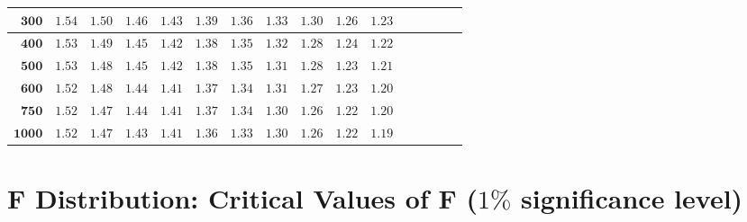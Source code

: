 \begin{longtable}{|r|r|r|r|r|r|r|r|r|r|r|r|r|r|r|r|}
    \(\mathbf{300}\)& \(1.54\) & \(1.50\) & \(1.46\) & \(1.43\) & \(1.39\) & \(1.36\) & \(1.33\) & \(1.30\) & \(1.26\) & \(1.23\) \\ \hline 
    \(\mathbf{400}\)& \(1.53\) & \(1.49\) & \(1.45\) & \(1.42\) & \(1.38\) & \(1.35\) & \(1.32\) & \(1.28\) & \(1.24\) & \(1.22\) \\ \hline 
    \(\mathbf{500}\)& \(1.53\) & \(1.48\) & \(1.45\) & \(1.42\) & \(1.38\) & \(1.35\) & \(1.31\) & \(1.28\) & \(1.23\) & \(1.21\) \\ \hline 
    \(\mathbf{600}\)& \(1.52\) & \(1.48\) & \(1.44\) & \(1.41\) & \(1.37\) & \(1.34\) & \(1.31\) & \(1.27\) & \(1.23\) & \(1.20\) \\ \hline 
    \(\mathbf{750}\)& \(1.52\) & \(1.47\) & \(1.44\) & \(1.41\) & \(1.37\) & \(1.34\) & \(1.30\) & \(1.26\) & \(1.22\) & \(1.20\) \\ \hline 
    \(\mathbf{1000}\)& \(1.52\) & \(1.47\) & \(1.43\) & \(1.41\) & \(1.36\) & \(1.33\) & \(1.30\) & \(1.26\) & \(1.22\) & \(1.19\) \\ \hline 


\end{longtable}
\changefontsizes{11pt}


\newpage

\section{F Distribution: Critical Values of F ($1\%$ significance level)}


\setlength{\LTleft}{-1cm} %
\setlength{\LTright}{-1cm} %

